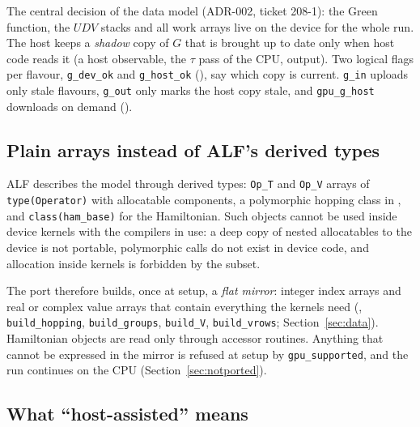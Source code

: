 The central decision of the data model (ADR-002, ticket 208-1): the Green function, the $UDV$ stacks and all work arrays live on the device for the whole run. The host keeps a \emph{shadow} copy of $G$ that is brought up to date only when host code reads it (a host observable, the $\tau$ pass of the CPU, output). Two logical flags per flavour, \texttt{g\_dev\_ok} and \texttt{g\_host\_ok} (), say which copy is current. \texttt{g\_in} uploads only stale flavours, \texttt{g\_out} only marks the host copy stale, and \texttt{gpu\_g\_host} downloads on demand ().


\subsection{Plain arrays instead of ALF's derived types}

ALF describes the model through derived types: \texttt{Op\_T} and \texttt{Op\_V} arrays of \texttt{type(Operator)} with allocatable components, a polymorphic hopping class in , and \texttt{class(ham\_base)} for the Hamiltonian. Such objects cannot be used inside device kernels with the compilers in use: a deep copy of nested allocatables to the device is not portable, polymorphic calls do not exist in device code, and allocation inside kernels is forbidden by the subset.

The port therefore builds, once at setup, a \emph{flat mirror}: integer index arrays and real or complex value arrays that contain everything the kernels need (, \texttt{build\_hopping}, \texttt{build\_groups}, \texttt{build\_V}, \texttt{build\_vrows}; Section~\ref{sec:data}). Hamiltonian objects are read only through accessor routines. Anything that cannot be expressed in the mirror is refused at setup by \texttt{gpu\_supported}, and the run continues on the CPU (Section~\ref{sec:notported}).

\subsection{What ``host-assisted'' means}

